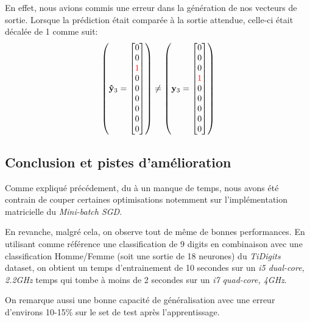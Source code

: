 \documentclass[11pt]{article}
\begin{document}
En effet, nous avions commis une erreur dans la g\'en\'eration de nos vecteurs de
sortie. Lorsque la pr\'ediction \'etait compar\'ee \`a la sortie attendue,
celle-ci \'etait d\'ecal\'ee de 1 comme suit:
\begin{equation}
	\left (
	{\bf \hat y}_3 =
	\begin{bmatrix}
		0 \\
		0 \\
		{\color{red} 1 }\\
		0 \\
		0 \\
		0 \\
		0 \\
		0 \\
		0 \\
	\end{bmatrix}
	\right )
	\ne
	\left (
	{\bf y}_3 =
	\begin{bmatrix}
		0 \\
		0 \\
		0 \\
		{\color{red} 1 }\\
		0 \\
		0 \\
		0 \\
		0 \\
		0 \\
	\end{bmatrix}
	\right )
\end{equation}

\subsection{Conclusion et pistes d'am\'elioration}
Comme expliqu\'e pr\'ec\'edement, du \`a un manque de temps, nous avons
\'et\'e contrain de couper certaines optimisations notemment sur
l'impl\'ementation matricielle du {\em Mini-batch SGD}.

En revanche, malgr\'e cela, on observe tout de m\^eme de bonnes performances.
En utilisant comme r\'ef\'erence une classification de 9 digits en combinaison
avec une classification Homme/Femme (soit une sortie de 18 neurones) du
{\em TiDigits} dataset, on obtient un temps d'entrainement de 10 secondes sur un
{\em i5 dual-core, 2.2GHz} temps qui tombe \`a moins de 2 secondes sur un
{\em i7 quad-core, 4GHz}.

On remarque aussi une bonne capacit\'e de g\'en\'eralisation avec une erreur
d'environs 10-15\% sur le set de test apr\`es l'apprentissage.
\end{document}
